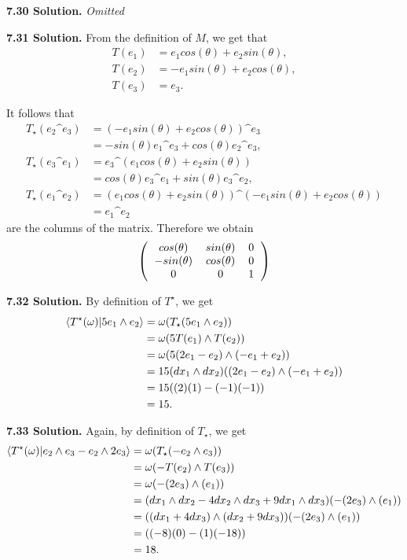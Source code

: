 \textbf{7.30 Solution.} \textit{Omitted}

\textbf{7.31 Solution.} From the definition of $M$, we get that
\begin{align*}
    T(e_1) &= e_1cos(\theta) + e_2sin(\theta), \\
    T(e_2) &= -e_1sin(\theta) + e_2cos(\theta), \\
    T(e_3) &= e_3.
\end{align*}

It follows that
\begin{align*}
    T_\star(e_2 \^ e_3) &= (-e_1sin(\theta) + e_2cos(\theta)) \^ e_3 \\
        &= -sin(\theta)e_1 \^ e_3 + cos(\theta)e_2 \^ e_3, \\
    T_\star(e_3 \^ e_1) &= e_3 \^ (e_1cos(\theta) + e_2sin(\theta)) \\
        &= cos(\theta)e_3 \^ e_1 + sin(\theta)e_3 \^ e_2, \\
    T_\star(e_1 \^ e_2) &= (e_1cos(\theta) + e_2sin(\theta)) \^ (-e_1sin(\theta) + e_2cos(\theta)) \\
        &= e_1 \^ e_2 
\end{align*}
are the columns of the matrix. Therefore we obtain
\[\left(\begin{tabular}{ccc}
    $cos(\theta)$ & $sin(\theta)$ & 0 \\
    $-sin(\theta)$ & $cos(\theta)$ & 0 \\
    0 & 0 & 1
\end{tabular}\right)\]

\textbf{7.32 Solution.} By definition of $T^\star$, we get
\begin{align*}
    \langle T^\star(\omega) | 5e_1 \wedge e_2\rangle &= \omega(T_\star(5e_1 \wedge e_2)) \\
    &= \omega(5T(e_1) \wedge T(e_2)) \\
    &= \omega(5(2e_1 - e_2) \wedge (-e_1 + e_2)) \\
    &= 15(dx_1 \wedge dx_2)((2e_1 - e_2) \wedge (-e_1 + e_2)) \\
    &= 15((2)(1) - (-1)(-1)) \\
    &= 15.
\end{align*}

\textbf{7.33 Solution.} Again, by definition of $T_\star$, we get
\begin{align*}
    \langle T^\star(\omega) | e_2 \wedge e_3 - e_2 \wedge 2e_3\rangle &= \omega(T_\star(-e_2 \wedge e_3)) \\
    &= \omega(-T(e_2) \wedge T(e_3)) \\
    &= \omega(-(2e_3) \wedge (e_1)) \\
    &= (dx_1 \wedge dx_2 - 4dx_2 \wedge dx_3 + 9dx_1 \wedge dx_3)(-(2e_3) \wedge (e_1)) \\
    &= ((dx_1 + 4dx_3) \wedge (dx_2 + 9dx_3))(-(2e_3) \wedge (e_1)) \\
    &= ((-8)(0) - (1)(-18)) \\
    &= 18.
\end{align*}

